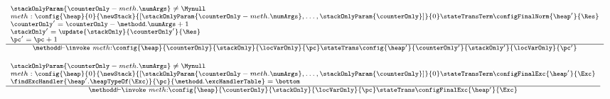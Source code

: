\begin{figure}[ht!] 
\begin{frameit}
 $$ \begin{array}{l}
              {\scriptsize \frac{\begin{array}{l} 
	                        \stackOnlyParam{ \counterOnly - meth.\numArgs } \neq \Mynull   \\
	                         meth :         \config{\heap}       
                                                       {0}
						       {\newStack }
                                                       {\lbrack \stackOnlyParam{ \counterOnly - meth.\numArgs },\ldots ,\stackOnlyParam{ \counterOnly} \rbrack }
						       {0} 
						       \stateTransTerm 
						       \configFinalNorm{\heap'}{\Res}\\
				                       \counterOnly' = \counterOnly - \methodd.\numArgs + 1 \\
						       \stackOnly' = \update{\stackOnly}{\counterOnly'}{\Res} \\
						       \pc' = \pc + 1
			         \end{array}  }	         
	         {\methodd \vdash \invoke \  meth :  \config{\heap}{\counterOnly}{\stackOnly}{\locVarOnly}{\pc} 
		                        \stateTrans  
					\config{\heap' }{\counterOnly'}{\stackOnly' }{\locVarOnly}{\pc'}} }  \\\\
	   {\scriptsize \frac{\begin{array}{l}
	                            \stackOnlyParam{ \counterOnly - meth.\numArgs } \neq \Mynull   \\
	                             meth:             \config{\heap}       
                                                       {0}
						       {\newStack }
                                                       {\lbrack \stackOnlyParam{ \counterOnly - meth.\numArgs },\ldots ,\stackOnlyParam{ \counterOnly} \rbrack }
						       {0} 
						         \stateTransTerm 
						       \configFinalExc{\heap'}{\Exc}\\
				     \findExcHandler{\heap'.\heapTypeOf(\Exc)  }{\pc}{\methodd.\excHandlerTable} = \bottom 
	                        \end{array}}	         
	         {\methodd \vdash \invoke \  meth :  
		                         \config{\heap}{\counterOnly}{\stackOnly}{\locVarOnly}{\pc} 
		                        \stateTrans  
					\configFinalExc{\heap'}{\Exc}	} }  \\\\

\end{array}$$
\end{frameit}
\end{figure}
